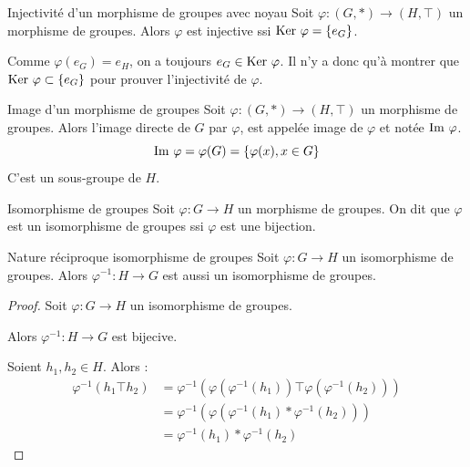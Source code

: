 \begin{theoreme}{Injectivité d'un morphisme de groupes avec noyau}{}
    Soit $\varphi : (G, \ast) \to (H, \top)$ un morphisme de groupes.
    Alors $\varphi$ est injective ssi $\operatorname{Ker} \, \varphi = \{e_G\}$.
\end{theoreme}

\begin{remarque}
    Comme $\varphi(e_G) = e_H$, on a toujours $e_G \in \operatorname{Ker} \, \varphi$.
    Il n'y a donc qu'à montrer que $\operatorname{Ker} \, \varphi \subset \{e_G\}$ pour prouver l'injectivité de $\varphi$.
\end{remarque}

\begin{proposition}{Image d'un morphisme de groupes}{}
    Soit $\varphi : (G, \ast) \to (H, \top)$ un morphisme de groupes. Alors l'image directe de 
    $G$ par $\varphi$, est appelée image de $\varphi$ et notée $\operatorname{Im} \, \varphi$.
    \[\operatorname{Im} \, \varphi = \varphi(G) = \{\varphi(x), x \in G\}\]
    C'est un sous-groupe de $H$.
\end{proposition}

\begin{definition}{Isomorphisme de groupes}{}
    Soit $\varphi : G \to H$ un morphisme de groupes. On dit que $\varphi$ est un isomorphisme 
    de groupes ssi $\varphi$ est une bijection. 
\end{definition}

\begin{theoreme}{Nature réciproque isomorphisme de groupes}{}
    Soit $\varphi : G \to H$ un isomorphisme de groupes. Alors $\varphi^{-1} : H \to G$ est aussi un isomorphisme de
    groupes.
\end{theoreme}


\begin{proof}
    Soit $\varphi : G \to H$ un isomorphisme de groupes. 

    Alors $\varphi^{-1} : H \to G$ est bijecive. 

    Soient $h_1, h_2 \in H$. Alors :
    \begin{align*}
        \varphi^{-1}(h_1 \top h_2) & = \varphi^{-1}(\varphi(\varphi^{-1}(h_1)) \top \varphi(\varphi^{-1}(h_2)))\\
        & = \varphi^{-1}(\varphi(\varphi^{-1}(h_1) \ast \varphi^{-1}(h_2))) \\
        & = \varphi^{-1}(h_1) \ast \varphi^{-1}(h_2)
    \end{align*}
\end{proof}

